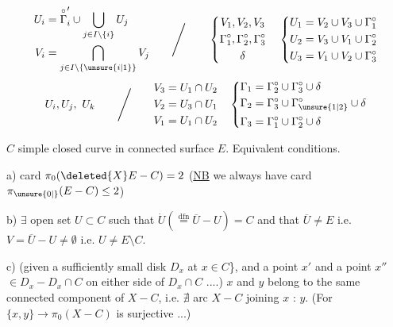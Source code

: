 \[
\begin{aligned}
 U_i&=\overset{\circ}{\Gamma}'_i\cup\bigcup_{j\in I\setminus\{i\}}U_j\\
 V_i&=\bigcap_{j\in I\setminus\{\unsure{i|1}\}}V_j
\end{aligned}
\qquad\Bigg/\qquad
\left\{\begin{gathered}
 V_1,V_2,V_3\\ \Gamma_1^\circ,\Gamma_2^\circ,\Gamma_3^\circ\\ \delta
\end{gathered}\right.
\quad
\left\{\begin{aligned}
 U_1&=V_2\cup V_3\cup\Gamma_1^\circ\\
 U_2&=V_3\cup V_1\cup\Gamma_2^\circ\\
 U_3&=V_1\cup V_2\cup\Gamma_3^\circ
\end{aligned}\right.
\]
\[
 U_i,U_j,\ U_k\qquad\Bigg/\qquad
\begin{aligned}
 V_3&=U_1\cap U_2\\
 V_2&=U_3\cap U_1\\
 V_1&=U_1\cap U_2
\end{aligned}
\quad
\left\{\begin{aligned}
 \Gamma_1&=\Gamma_2^\circ\cup\Gamma_3^\circ\cup\delta\\
 \Gamma_2&=\Gamma_3^\circ\cup\Gamma_{\unsure{1|2}}^\circ\cup\delta\\
 \Gamma_3&=\Gamma_1^\circ\cup\Gamma_2^\circ\cup\delta
\end{aligned}\right.
\]

$C$ simple closed curve in connected surface $E$. Equivalent conditions.

a) card $\pi_0(\deleted{X}E-C)=2$ \quad (\uline{NB} we always have card $\pi_{\unsure{0|{}}}(E-C)\le 2$)

b) $\exists$ open set $U\subset C$ such that $\dot U(\overset{\text{dfn}}{=}\overline U-U)=C$ and that 
$\overline U\ne E$ i.e. $V=\overline U-U\ne\emptyset$ i.e. $U\ne E\setminus C$.

c) (given a sufficiently small disk $D_x$  at $x\in C$\}, and a point $x'$ and a point $x''$ $\in D_x-D_x\cap C$ on either side of $D_x\cap C$ ....)
$x$ and $y$   belong to the same connected component of $X-C$, i.e. $\nexists$ arc  $X-C$ joining $x$ : $y$.
(For $\{x,y\}\longrightarrow\pi_0(X-C)$ is surjective ...)
